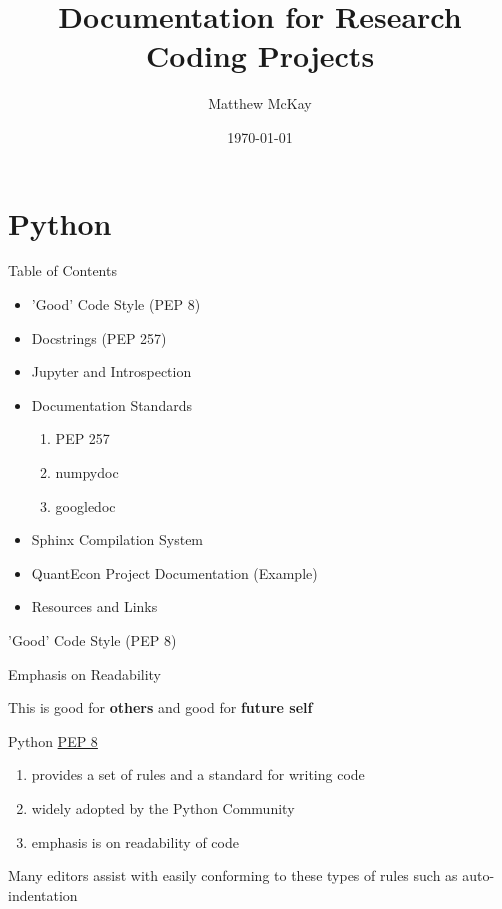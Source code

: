 \documentclass{beamer}
\title{Documentation for Research Coding Projects}
\date{\today}
\author{Matthew McKay}
\institute{QuantEcon - Research School of Economics, ANU, Australia}
\begin{document}
\maketitle

\section{Python}

\begin{frame}{Table of Contents}
\begin{itemize}
    \item 'Good' Code Style (PEP 8)
    \item Docstrings (PEP 257)
    \item Jupyter and Introspection
    \item Documentation Standards
        \begin{enumerate}
            \item PEP 257
            \item numpydoc
            \item googledoc
        \end{enumerate}
    \item Sphinx Compilation System
    \item QuantEcon Project Documentation (Example)
    \item Resources and Links
\end{itemize}    
\end{frame}

\begin{frame}{'Good' Code Style (PEP 8)}

Emphasis on Readability

This is good for \textbf{others} and good for \textbf{future self}

Python \href{https://www.python.org/dev/peps/pep-0008/}{PEP 8}

\begin{enumerate}
\item provides a set of rules and a standard for writing code
\item widely adopted by the Python Community
\item emphasis is on readability of code
\end{enumerate}

Many editors assist with easily conforming to these types of rules such as auto-indentation

\end{frame}
\end{document}
